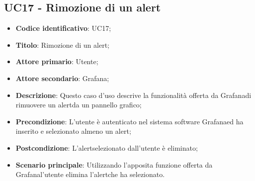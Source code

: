 \subsection{UC17 - Rimozione di un alert}
\begin{itemize}
	\item \textbf{Codice identificativo}: UC17;
	\item \textbf{Titolo}: Rimozione di un alert\glo;
	\item \textbf{Attore primario}: Utente;
	\item \textbf{Attore secondario}: Grafana\glo;
	\item \textbf{Descrizione}: Questo caso d'uso descrive la funzionalità offerta da Grafana\glosp di rimuovere un alert\glosp da un pannello grafico;
	\item \textbf{Precondizione}: L'utente è autenticato nel sistema software Grafana\glosp ed ha inserito e selezionato almeno un alert\glo;
	\item \textbf{Postcondizione}: L'alert\glosp selezionato dall'utente è eliminato;
	\item \textbf{Scenario principale}: Utilizzando l'apposita funzione offerta da Grafana\glosp l'utente elimina l'alert\glosp che ha selezionato.
\end{itemize} 
